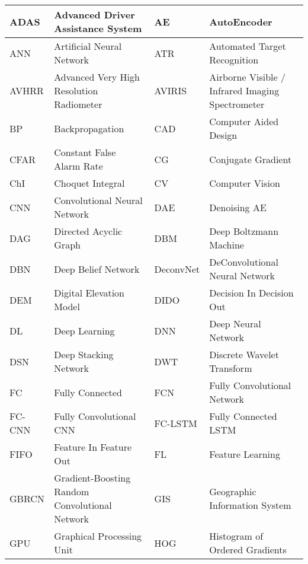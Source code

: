 \documentclass[12pt]{spieman}
\begin{document}
\begin{spacing}{1}
\begin{center}
\begin{longtable}{|p{1.5cm}|p{5.5cm}|p{1.5cm}|p{5.5cm}|}
ADAS      & Advanced Driver Assistance System &                        AE        & AutoEncoder   \\  \hline
ANN       & Artificial Neural Network &                                ATR       & Automated Target Recognition \\  \hline
AVHRR     & Advanced Very High Resolution Radiometer &                 AVIRIS    & Airborne Visible / Infrared Imaging Spectrometer \\  \hline
BP        & Backpropagation &                                          CAD       & Computer Aided Design \\  \hline
CFAR      & Constant False Alarm Rate &                                CG        & Conjugate Gradient \\  \hline
ChI       & Choquet Integral &                                         CV        & Computer Vision \\  \hline
CNN       & Convolutional Neural Network &                             DAE       & Denoising AE      \\  \hline
DAG       & Directed Acyclic Graph &                                   DBM       & Deep Boltzmann Machine \\  \hline
DBN       & Deep Belief Network &                                      DeconvNet      & DeConvolutional Neural Network \\  \hline
DEM       & Digital Elevation Model &                                  DIDO      & Decision In Decision Out \\  \hline
DL        & Deep Learning &                                            DNN       & Deep Neural Network \\  \hline
DSN       & Deep Stacking Network &                                    DWT       & Discrete Wavelet Transform \\  \hline
FC        & Fully Connected &                                          FCN       & Fully Convolutional Network \\  \hline
FC-CNN    & Fully Convolutional CNN &                                  FC-LSTM   & Fully Connected LSTM \\  \hline
FIFO      & Feature In Feature Out &                                   FL        & Feature Learning \\  \hline
GBRCN     & Gradient-Boosting Random Convolutional Network &           GIS       & Geographic Information System \\  \hline
GPU       & Graphical Processing Unit &                                HOG       & Histogram of Ordered Gradients \\  \hline

\end{longtable}
\end{center}
\end{spacing}
\end{document}

